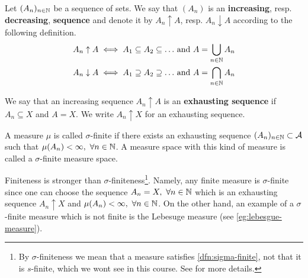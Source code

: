 Let $(A_n)_{n \in \mathbb{N}}$ be a sequence of sets. We say that $(A_n)$ is an \textbf{increasing}, resp. \textbf{decreasing}, \textbf{sequence} and denote it by $A_n \uparrow A$, resp. $A_n\downarrow A$ according to the following definition.
\begin{align}
	A_n \uparrow A \iff A_1 \subseteq A_2 \subseteq \dots &\text{ and } A = \bigcup_{n \in \mathbb{N}} A_n \\
	A_n \downarrow A \iff A_1 \supseteq A_2 \supseteq \dots &\text{ and } A = \bigcap_{n \in \mathbb{N}} A_n
\end{align}

We say that an increasing sequence $A_n \uparrow A$ is an \textbf{exhausting sequence} if $A_n \subseteq X$ and $A = X$. We write $A_n \uparrow X$ for an exhausting sequence.


\begin{dfn}
	\label{dfn:sigma-finite}
	A measure $\mu$ is called $\sigma$-finite if there exists an exhausting sequence $(A_n)_{n \in \mathbb{N}} \subset \mathcal{A}$ such that $\mu(A_n) < \infty,\ \forall n \in \mathbb{N}$. A measure space with this kind of measure is called a $\sigma$-finite measure space.
\end{dfn}

\begin{remark}
	Finiteness is stronger than $\sigma$-finiteness\footnote{By $\sigma$-finiteness we mean that a measure satisfies \autoref{dfn:sigma-finite}, not that it is $s$-finite, which we wont see in this course. See \cite{WSF} for more details.}. Namely, any finite measure is $\sigma$-finite since one can choose the sequence $A_n = X,\ \forall n \in \N$ which is an exhausting sequence $A_n\uparrow X$ and $\mu(A_n) < \infty,\ \forall n \in \mathbb{N}$. On the other hand, an example of a $\sigma$-finite measure which is not finite is the Lebesuge measure (see \autoref{eg:lebesgue-measure}).
\end{remark}

